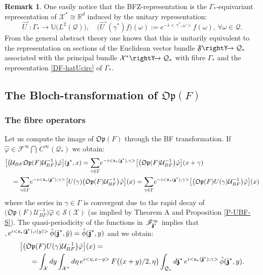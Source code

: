 \documentclass[12pt]{article}
\theoremstyle{definition}
\newtheorem{remark}[theorem]{Remark}
\def\Rd{\mathbb{R}^d}
\def\Op{\mathfrak{Op}}
\def\X{\mathcal X}
\def\U{\mathcal{U}}
\def\T{\mathcal{Q}}
\def\s{\mathfrak{s}}
\def\bz{\mathfrak{z}\hspace*{-4pt}\mathfrak{z}}
\def\repi{\rightY\hspace*{-4pt}\rightarrow}
\def\tbz{\tilde{\bz}}
\def\beq{\begin{equation}}
\def\eeq{\end{equation}}
\numberwithin{equation}{section}
\begin{document}
\begin{remark}\label{R-F-vect-bdl}
One easily notice that the BFZ-representation is the $\Gamma_*$-equivariant representation of $\X^*\cong\Rd$ induced by the unitary representation:
\beq\label{DF-hatUcirc}
\hat{U}^\circ:\Gamma_*\rightarrow\mathbb{U}\big(L^2(\T)\big),\quad\big(\hat{U}^\circ(\gamma^*)f\big)(\omega):=e^{-i<\gamma^*,\omega>}f(\omega),\,\forall\omega\in\T.
\eeq
From the general abstract theory one knows that this is unitarily equivalent to the representation on sections of the Euclidean vector bundle $\mathfrak{F}\repi\T_*$  associated with  the principal bundle $\X^*\repi\T_*$ with fibre $\Gamma_*$ and the representation \eqref{DF-hatUcirc} of $\Gamma_*$. 
\end{remark}


\subsection{The Bloch-transformation of $\Op(F)$}\label{SSS-Btrs-OAF}

\subsubsection{The fibre operators}

Let us compute the image of $\Op(F)$ through the BF transformation.
If $\hat{\varphi}\in\mathscr{F}^\infty\bigcap\,C^\infty(\T_*)$ we obtain:
\begin{align}\label{F-PN-N-2}
&\big[\big(\U_{BF}\Op(F)\U_{BF}^{-1}\big)\hat{\varphi}\big](\bz^*,x)=\underset{\gamma\in\Gamma}{\sum}e^{-i<\s_*(\bz^*),\gamma>}\big[\big(\Op(F)\U_{BF}^{-1}\big)\hat{\varphi}\big](x+\gamma)\\ \nonumber
&\quad=\underset{\gamma\in\Gamma}{\sum}e^{-i<\s_*(\bz^*),\gamma>}\big[U(\gamma)\big(\Op(F)\U_{BF}^{-1}\big)\hat{\varphi}\big](x)=\underset{\gamma\in\Gamma}{\sum}e^{-i<\s_*(\bz^*),\gamma>}\big[\big(\Op(F)U(\gamma)\U_{BF}^{-1}\big)\hat{\varphi}\big](x)
\end{align}
where the series in $\gamma\in\Gamma$ is convergent due to the rapid decay of $\big(\Op(F)\U_{BF}^{-1}\big)\hat{\varphi}\in\mathscr{S}(\X)$ (as implied by Theorem A and Proposition \ref{P-UBF-S}). The quasi-periodicity of the functions in $\mathscr{F}^\infty_{\tbz^*}$ implies that $,e^{i<\s_*(\tbz^*),\iota(y)>}\,\hat{\phi}(\tbz^*,\hat{y})=\hat{\phi}(\tbz^*,y)$ and we obtain:
\begin{align}\label{F-PN-N-1}
&\big[\big(\Op(F)U(\gamma)\U_{BF}^{-1}\big)\hat{\varphi}\big](x)=\\ \nonumber
&\hspace*{0.5cm}=\int_{\X}dy\int_{\X^*}d\eta\,e^{i<\eta,x-y>}\,F\big((x+y)/2,\eta\big)\int_{\T_*}d\tbz^*\,e^{i<\s_*(\tbz^*),\gamma>}\,\hat{\phi}(\tbz^*,y).
\end{align}
\end{document}
